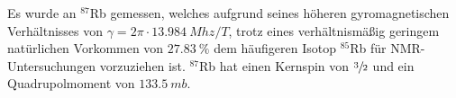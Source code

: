 Es wurde an $^\text{87}$Rb gemessen, welches aufgrund seines höheren gyromagnetischen Verhältnisses von $\gamma = 2\pi \cdot \SI{13.984}{Mhz / T}$, trotz eines verhältnismäßig geringem natürlichen Vorkommen von $\SI{27.83}{\percent}$ dem häufigeren Isotop $^\text{85}$Rb für NMR-Untersuchungen vorzuziehen ist. $^\text{87}$Rb hat einen Kernspin von $\sfrac{3}{2}$ und ein Quadrupolmoment von $\SI{133.5}{mb}$.
